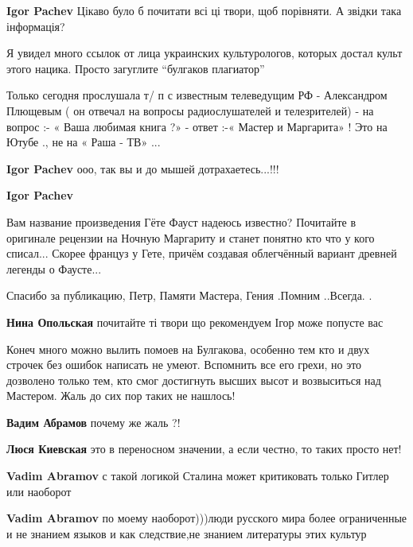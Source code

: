 \begin{itemize}
\begin{itemize}
\textbf{Igor Pachev} Цікаво було б почитати всі ці твори, щоб порівняти. А звідки така інформація?


Я увидел много ссылок от лица украинских культурологов, которых достал культ
этого нацика. Просто загуглите \enquote{булгаков плагиатор}


Только сегодня прослушала т/ п с известным телеведущим РФ - Александром
Плющевым ( он отвечал на вопросы радиослушателей и телезрителей) - на вопрос :-
« Ваша любимая книга ?» - ответ :-« Мастер и Маргарита» ! Это на Ютубе ., не на
« Раша - ТВ» ...


\textbf{Igor Pachev} ооо, так вы и до мышей дотрахаетесь...!!!

\textbf{Igor Pachev} 

Вам название произведения Гёте Фауст надеюсь известно? Почитайте в оригинале
рецензии на Ночную Маргариту и станет понятно кто что у кого списал... Скорее
француз у Гете, причём создавая облегчённый вариант древней легенды о Фаусте...

\end{itemize} %


Спасибо за публикацию, Петр, Памяти Мастера, Гения .Помним ..Всегда. .

\textbf{Нина Опольская} почитайте ті твори що рекомендуем Ігор може попусте вас


Конеч много можно вылить помоев на Булгакова, особенно тем кто и двух строчек
без ошибок написать не умеют. Вспомнить все его грехи, но это дозволено только
тем, кто смог достигнуть высших высот и возвыситься над Мастером. Жаль до сих пор
таких не нашлось!

\begin{itemize} %
\textbf{Вадим Абрамов} почему же жаль ?!

\textbf{Люся Киевская} это в переносном значении, а если честно, то таких просто нет!

\textbf{Vadim Abramov} с такой логикой Сталина может критиковать только Гитлер или наоборот

\textbf{Vadim Abramov} по моему наоборот)))люди русского мира более ограниченные и не знанием языков и как следствие,не знанием литературы этих культур


\end{itemize}
\end{itemize}

